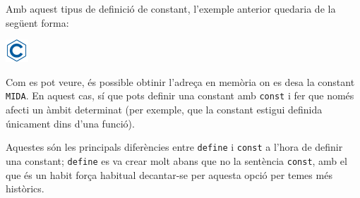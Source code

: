 \documentclass[]{book}
\newenvironment{Shaded}{\begin{snugshade}}{\end{snugshade}}
\newcommand{\DataTypeTok}[1]{\textcolor[rgb]{0.13,0.29,0.53}{#1}}
\newcommand{\DecValTok}[1]{\textcolor[rgb]{0.00,0.00,0.81}{#1}}
\newcommand{\CharTok}[1]{\textcolor[rgb]{0.31,0.60,0.02}{#1}}
\newcommand{\SpecialCharTok}[1]{\textcolor[rgb]{0.00,0.00,0.00}{#1}}
\newcommand{\StringTok}[1]{\textcolor[rgb]{0.31,0.60,0.02}{#1}}
\newcommand{\ImportTok}[1]{#1}
\newcommand{\CommentTok}[1]{\textcolor[rgb]{0.56,0.35,0.01}{\textit{#1}}}
\newcommand{\ControlFlowTok}[1]{\textcolor[rgb]{0.13,0.29,0.53}{\textbf{#1}}}
\newcommand{\PreprocessorTok}[1]{\textcolor[rgb]{0.56,0.35,0.01}{\textit{#1}}}
\newcommand{\NormalTok}[1]{#1}
\begin{document}
Amb aquest tipus de definició de constant, l'exemple anterior quedaria
de la següent forma:

\includegraphics{./img/c.png}

\begin{Shaded}
\end{Shaded}

Com es pot veure, és possible obtinir l'adreça en memòria on es desa la
constant \texttt{MIDA}. En aquest cas, sí que pots definir una constant
amb \texttt{const} i fer que només afecti un àmbit determinat (per
exemple, que la constant estigui definida únicament dins d'una funció).

Aquestes són les principals diferències entre \texttt{define} i
\texttt{const} a l'hora de definir una constant; \texttt{define} es va
crear molt abans que no la sentència \texttt{const}, amb el que és un
habit força habitual decantar-se per aquesta opció per temes més
històrics.
\end{document}

